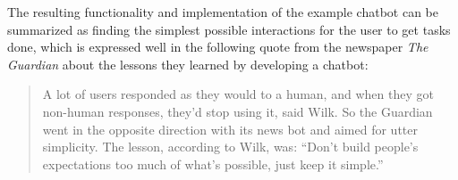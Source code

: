 The resulting functionality and implementation of the example chatbot can be summarized as finding the simplest possible interactions for the user to get tasks done, which is expressed well in the following quote from the newspaper \emph{The Guardian}\cite{digiday} about the lessons they learned by developing a chatbot:

\begin{quote}
A lot of users responded as they would to a human, and when they got non-human responses, they’d stop using it, said Wilk. So the Guardian went in the opposite direction with its news bot and aimed for utter simplicity. The lesson, according to Wilk, was: “Don’t build people’s expectations too much of what’s possible, just keep it simple.”
\end{quote}
